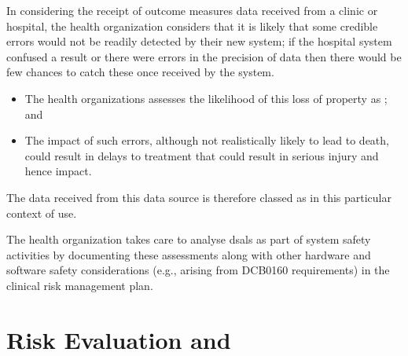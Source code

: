 In considering the receipt of outcome measures data received from a clinic or hospital, the health organization considers that it is likely that some credible errors would not be readily detected by their new system; if the hospital system confused a result or there were errors in the precision of data then there would be few chances to catch these once received by the system.
\begin{itemize}
  \item The health organizations assesses the likelihood of this loss of property as ; and
  \item The impact of such errors, although not realistically likely to lead to death, could result in delays to treatment that could result in serious injury and hence  impact.
\end{itemize}

The data received from this data source is therefore classed as  in this particular context of use.

The health organization takes care to analyse \glspl{dsal} as part of system safety activities by documenting these assessments along with other hardware and software safety considerations (e.g., arising from DCB0160 requirements) in the clinical risk management plan.

\section{Risk Evaluation and }

